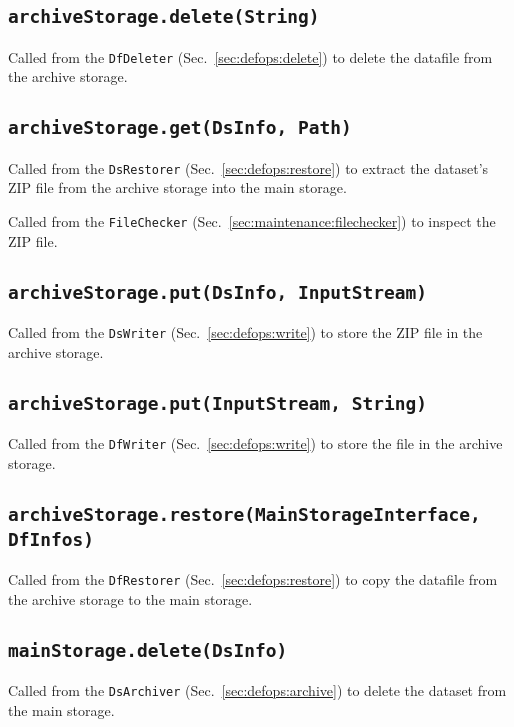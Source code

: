 \documentclass[paper=a4]{scrartcl}
\begin{document}
\subsection{\texttt{archiveStorage.delete(String)}}

Called from the \texttt{DfDeleter} (Sec.~\ref{sec:defops:delete}) to
delete the datafile from the archive storage.

\subsection{\texttt{archiveStorage.get(DsInfo, Path)}}

Called from the \texttt{DsRestorer} (Sec.~\ref{sec:defops:restore})
to extract the dataset's ZIP file from the archive storage into the
main storage.

Called from the \texttt{FileChecker}
(Sec.~\ref{sec:maintenance:filechecker}) to inspect the ZIP file.

\subsection{\texttt{archiveStorage.put(DsInfo, InputStream)}}

Called from the \texttt{DsWriter} (Sec.~\ref{sec:defops:write}) to
store the ZIP file in the archive storage.

\subsection{\texttt{archiveStorage.put(InputStream, String)}}

Called from the \texttt{DfWriter} (Sec.~\ref{sec:defops:write}) to
store the file in the archive storage.

\subsection{\texttt{archiveStorage.restore(MainStorageInterface, DfInfos)}}

Called from the \texttt{DfRestorer} (Sec.~\ref{sec:defops:restore})
to copy the datafile from the archive storage to the main storage.

\subsection{\texttt{mainStorage.delete(DsInfo)}}

Called from the \texttt{DsArchiver} (Sec.~\ref{sec:defops:archive})
to delete the dataset from the main storage.
\end{document}
